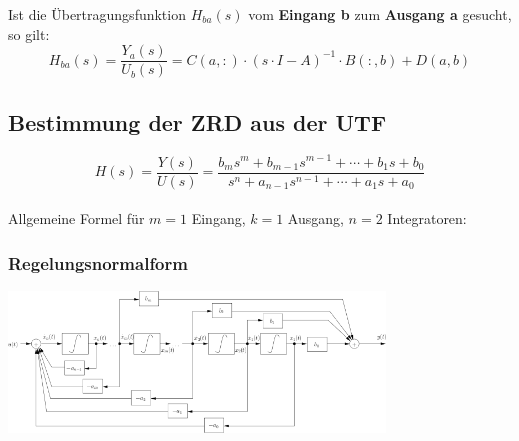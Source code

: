   Ist die Übertragungsfunktion $H_{ba}(s)$ vom \textbf{Eingang b} zum \textbf{Ausgang a} gesucht, so gilt:
  \[
    H_{ba}(s) = \frac{Y_a(s)}{U_b(s)} = C(a,:) \cdot (s \cdot I -A)^{-1} \cdot B(:,b) + D(a,b)
  \]

\newpage

\subsection{Bestimmung der ZRD aus der UTF}
  \[ \boxed{
  H(s)=\frac{Y(s)}{U(s)}=\frac{b_{m} s^{m} + b_{m-1} s^{m-1} +\cdots+b_{1} s 
  + b_{0}}{s^{n} + a_{n-1} s^{n-1} + \cdots + a_{1} s + a_{0}}}
  \]\\
  Allgemeine Formel für $m=1$ Eingang, $k=1$ Ausgang, $n=2$ Integratoren:


\subsubsection{Regelungsnormalform }
  \includegraphics[width=10cm]{./images/zrd-regelungsnormalform.png} \\
  \scriptsize
